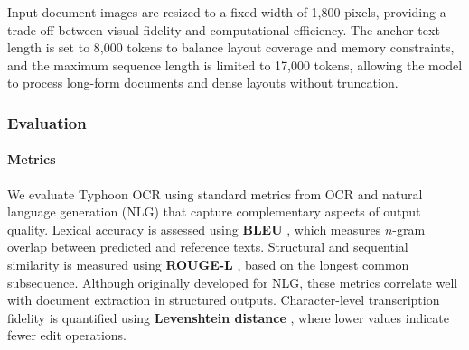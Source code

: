 \documentclass[]{typhoon} %
\begin{document}
Input document images are resized to a fixed width of 1,800 pixels, providing a trade-off between visual fidelity and computational efficiency. The anchor text length is set to 8,000 tokens to balance layout coverage and memory constraints, and the maximum sequence length is limited to 17,000 tokens, allowing the model to process long-form documents and dense layouts without truncation.


\subsubsection{Evaluation}\label{sec:v1_eval}

\paragraph{Metrics}
We evaluate Typhoon OCR using standard metrics from OCR and natural language generation (NLG) that capture complementary aspects of output quality. Lexical accuracy is assessed using \textbf{BLEU} \citep{papineni-etal-2002-bleu}, which measures $n$-gram overlap between predicted and reference texts. Structural and sequential similarity is measured using \textbf{ROUGE-L} \citep{lin-2004-rouge}, based on the longest common subsequence. Although originally developed for NLG, these metrics correlate well with document extraction in structured outputs. Character-level transcription fidelity is quantified using \textbf{Levenshtein distance} \citep{haldar2011levenshteindistancetechniquedictionary}, where lower values indicate fewer edit operations.
\end{document}
